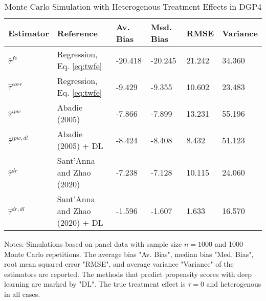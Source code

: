 \begin{table}[]
\centering
\begin{threeparttable}
\caption{Monte Carlo Simulation with Heterogenous Treatment Effects in DGP4}
\label{tab:table3}
\begin{tabular}{llllll}
\toprule
Estimator         & Reference                         & Av. Bias   & Med. Bias   & RMSE & Variance  \\ \midrule
\addlinespace
$\hat{\tau}^{fe}$ & Regression, Eq. \eqref{eq:twfe}               & -20.418      & -20.245        & 21.242 & 34.360      \\
$\hat{\tau}^{corr}$ & Regression, Eq. \eqref{eq:twfe}           & -9.429      & -9.355       & 10.602 & 23.483      \\
$\hat{\tau}^{ipw}$ & Abadie (2005)                    & -7.866       & -7.899       & 13.231 & 55.196      \\
$\hat{\tau}^{ipw,dl}$ & Abadie (2005) + DL            & -8.424       & -8.408        & 8.432 & 51.123      \\
$\hat{\tau}^{dr}$ & Sant'Anna and Zhao (2020)         & -7.238      & -7.128        & 10.115 & 24.060      \\
$\hat{\tau}^{dr,dl}$ & Sant'Anna and Zhao (2020) + DL & -1.596       & -1.607        & 1.633 & 16.570      \\

\bottomrule
\end{tabular}
\begin{tablenotes}
    \item Notes: Simulations based on panel data with sample size $n = 1000$ and 1000 Monte Carlo repetitions. The average bias "Av. Bias", median bias "Med. Bias", root mean squared error "RMSE", and average variance "Variance" of the estimators are reported. The methods that predict propensity scores with deep learning are marked by "DL". The true treatment effect is $\tau = 0$ and heterogenous in all cases.

\end{tablenotes}
\end{threeparttable}
\end{table}
